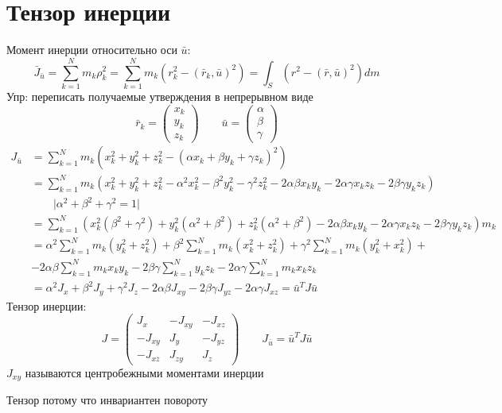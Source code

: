 \documentclass[crop=false]{standalone}
\begin{document}
\section{Тензор инерции}
\Def Момент инерции относительно оси $\bar u$:
\[\bar J_{\bar u} = \sum_{k=1}^{N} m_k \rho_k^2  = \sum_{k=1}^{N} m_k(r_k^2 - (\bar r_k, \bar u)^2) = \int_S (r^2 - (\bar r, \bar u)^2) d m\]
Упр: переписать получаемые утверждения в непрерывном виде
\[\bar r_k = \begin{pmatrix}
    x_k \\ y_k \\ z_k
\end{pmatrix} \qquad \bar u = \begin{pmatrix}
    \alpha \\ \beta \\ \gamma
\end{pmatrix}\]
\[
\begin{aligned}
J_{\bar u} &= \sum_{k=1}^{N} m_k (x_k^2 + y_k^2 + z_k^2 - (\alpha x_k + \beta y_k + \gamma z_k)^2) \\
& = \sum_{k=1}^{N} m_k( x_k^2 + y_k^2 + z_k^2 - \alpha^2 x_k^2 - \beta^2 y_k^2  - \gamma^2 z_k^2 - 2 \alpha \beta x_k y_k - 2 \alpha \gamma x_k z_k - 2\beta \gamma y_k z_k)\\
& \qquad \Bigg|\alpha^2 + \beta^2 + \gamma^2 = 1\Bigg| \\
&= \sum_{k=1}^{N} (x_k^2 ( \beta^2 + \gamma^2)+ y_k^2 (\alpha^2 + \beta^2) + z_k^2 (\alpha^2 + \beta^2 )  - 2 \alpha \beta x_k y_k - 2 \alpha \gamma x_k z_k - 2\beta \gamma y_k z_k) m_k \\
&= \alpha^2 \sum_{k=1}^{N} m_k(y_k^2 + z_k^2) + \beta^2 \sum_{k=1}^{N} m_k (x_k^2 + z_k^2) + \gamma^2 \sum_{k=1}^{N} m_k(y_k^2 + x_k^2) + \\
&- 2 \alpha \beta \sum_{k=1}^{N} m_k x_k y_k - 2 \beta \gamma\sum_{k=1}^{N} y_k z_k - 2 \alpha \gamma \sum_{k=1}^{N} m_k x_k z_k \\
&= \alpha^2 J_x + \beta^2 J_y + \gamma^2 J_z - 2 \alpha \beta J_{x y} - 2 \beta \gamma J_{y z} - 2 \alpha \gamma J_{x z}  = \bar u^T J \bar u
\end{aligned}
\] %
Тензор инерции:
\[J = \begin{pmatrix}
    J_x & - J_{x y} & - J_{x z} \\
    - J_{x y} & J_y & - J_{y z} \\
    - J_{x z} & J_{z y} & J_z
\end{pmatrix} \qquad J_{\bar u} = \bar u^T J \bar u\]
$J_{x y}$ называются центробежными моментами инерции

Тензор потому что инвариантен повороту
\end{document}
